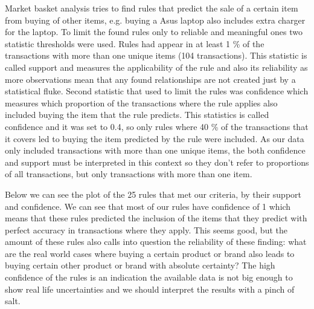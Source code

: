 \documentclass[12pt,a4paper,leqno]{report}
\theoremstyle{plain}
\theoremstyle{definition}
\theoremstyle{remark}
\begin{document}
Market basket analysis tries to find rules that predict the sale of a certain
item from buying of other items, e.g. buying a Asus laptop also includes extra
charger for the laptop. To limit the found rules only to reliable and meaningful
ones two statistic thresholds were used. Rules had appear in at least 1 \% of the
transactions with more than one unique items (104 transactions). This statistic
is called support and measures the applicability of the rule and also its
reliability as more observations mean that any found relationships
are not created just by a statistical fluke.
Second statistic that used to limit the rules was confidence which
measures which proportion of the transactions where the rule applies also
included buying the item that the rule predicts. This statistics is called
confidence and it was set to 0.4, so only rules where 40 \%
of the transactions that it covers led to buying the item predicted by the
rule were included. As our data only included transactions with more than
one unique items, the both confidence and support must be interpreted in this
context so they don't refer to proportions of all transactions, but only
transactions with more than one item.

Below we can see the plot of the 25 rules that met our criteria, by their
support and confidence. We can see that most of our rules have confidence
of 1 which means that these rules predicted the inclusion of the items
that they predict with perfect accuracy in transactions where they
apply. This seems good, but the amount of these rules also calls
into question the reliability of these finding: what are the real
world cases where buying a certain product or brand also leads
to buying certain other product or brand with absolute certainty?
The high confidence of the rules is an indication the available
data is not big enough to show real life uncertainties and we should
interpret the results with a pinch of salt.
\end{document}
